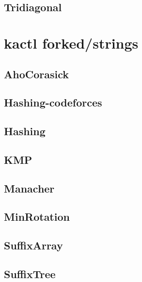 \subsection{Tridiagonal}
\raggedbottom
\hrulefill

\section{kactl forked/strings}
\subsection{AhoCorasick}
\raggedbottom
\hrulefill
\subsection{Hashing-codeforces}
\raggedbottom
\hrulefill
\subsection{Hashing}
\raggedbottom
\hrulefill
\subsection{KMP}
\raggedbottom
\hrulefill
\subsection{Manacher}
\raggedbottom
\hrulefill
\subsection{MinRotation}
\raggedbottom
\hrulefill
\subsection{SuffixArray}
\raggedbottom
\hrulefill
\subsection{SuffixTree}
\raggedbottom
\hrulefill
